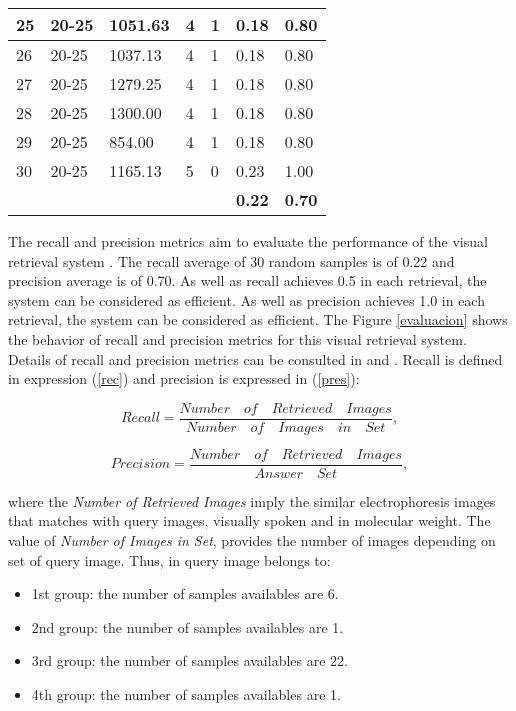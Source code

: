 \documentclass[a4paper]{llncs}
\begin{document}
\begin{table}[h!]
\begin{tabular}{p{1.5cm}p{1.5cm}p{1.5cm}p{1.5cm}p{1.5cm}p{1.5cm}p{1.5cm}}
\hline
25 & 20-25 & 1051.63 & 4 & 1 & 0.18 & 0.80\\
\hline
26 & 20-25 & 1037.13 & 4 & 1 & 0.18 & 0.80\\
\hline
27 & 20-25 & 1279.25 & 4 & 1 & 0.18 & 0.80\\
\hline
28 & 20-25 & 1300.00 & 4 & 1 & 0.18 & 0.80\\
\hline
29 & 20-25 & 854.00 & 4 & 1 & 0.18 & 0.80\\
\hline 
30 & 20-25 & 1165.13 & 5 & 0 & 0.23 & 1.00\\
\hline
 & & & & & \textbf{0.22} & \textbf{0.70} \\
 \hline
\end{tabular}

\label{pruebas}
\end{table}



The recall and precision metrics aim to evaluate the performance of the visual retrieval system \cite{Chen}. The recall average of 30 random samples is of 0.22 and precision average is of 0.70. As well as recall achieves 0.5 in each retrieval, the system can be considered as efficient. As well as precision achieves 1.0 in each retrieval, the system can be considered as efficient. The Figure \ref{evaluacion} shows the behavior of recall and precision metrics for this visual retrieval system. Details of recall and precision metrics can be consulted in \cite{Chen} and \cite{Baeza}. Recall is defined in expression (\ref{rec}) and precision is expressed in (\ref{pres}): 

\begin{equation}
Recall= \frac{Number \quad of \quad Retrieved \quad Images}{Number \quad of \quad Images \quad in \quad Set},
\label{rec}
\end{equation}

\begin{equation}
Precision= \frac{Number \quad of \quad Retrieved \quad Images}{Answer \quad Set},
\label{pres}
\end{equation}


\noindent where the \textit{Number of Retrieved Images} imply the similar electrophoresis images that matches with query images, visually spoken and in molecular weight. The value of \textit{Number of Images in Set}, provides the number of images depending on set of query image. Thus, in query image belongs to: 
\begin{itemize}
\item 1st group: the number of samples availables are 6.
\item 2nd group: the number of samples availables are 1.
\item 3rd group: the number of samples availables are 22.
\item 4th group: the number of samples availables are 1.
\end{itemize}
\end{document}
